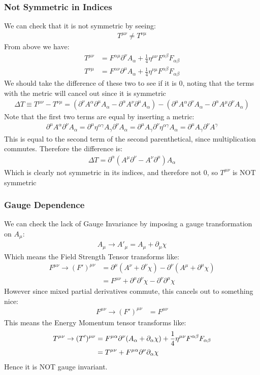 \documentclass[12pt]{article}
\newcommand{\D}{\partial}
\begin{document}
\subsubsection{Not Symmetric in Indices}
We can check that it is not symmetric by seeing:
\begin{align*}
  T^{\mu\nu}\neq T^{\nu\mu}
\end{align*}
From above we have:
\begin{align*}
  T^{\mu\nu}&=F^{\alpha\mu}\D^\nu A_\alpha
  +\frac14\eta^{\mu\nu}F^{\alpha\beta}F_{\alpha\beta}\\
  T^{\nu\mu}&=F^{\alpha\nu}\D^\mu A_\alpha
  +\frac14\eta^{\nu\mu}F^{\alpha\beta}F_{\alpha\beta}
\end{align*}
We should take the difference of these two to see if it is $0$, noting that the terms with the metric will cancel out since it is symmetric
\begin{align*}
  \Delta T\equiv T^{\mu\nu}-T^{\nu\mu}=
  (\D^\nu A^\alpha\D^\mu A_\alpha-\D^\alpha A^\nu\D^\mu A_\alpha)-
  (\D^\mu A^\alpha\D^\nu A_\alpha-\D^\alpha A^\mu\D^\nu A_\alpha)
\end{align*}
Note that the first two terms are equal by inserting a metric:
\begin{align*}
  \D^\mu A^\alpha\D^\nu A_\alpha=\D^\mu\eta^{\alpha\gamma}A_\gamma\D^\nu A_\alpha=
  \D^\mu A_\gamma\D^\nu\eta^{\alpha\gamma}A_\alpha=
  \D^\mu A_\gamma\D^\nu A^\gamma
\end{align*}
This is equal to the second term of the second parenthetical, since multiplication commutes. Therefore the difference is:
\begin{align*}
  \Delta T=\D^\alpha(A^\mu \D^\nu-A^\nu\D^\mu)A_\alpha
\end{align*}
Which is clearly not symmetric in its indices, and therefore not 0, so $T^{\mu\nu}$ is NOT symmetric

\subsubsection{Gauge Dependence}
We can check the lack of Gauge Invariance by imposing a gauge transformation on $A_\mu$:
\begin{align*}
  A_\mu\to A'_\mu=A_\mu+\D_\mu\chi
\end{align*}
Which means the Field Strength Tensor transforms like:
\begin{align*}
  F^{\mu\nu}\to (F')^{\mu\nu}&=
  \D^\mu(A^\nu+\D^\nu\chi)-\D^\nu(A^\mu+\D^\mu\chi)\\
  &=F^{\mu\nu}+\D^\mu\D^\nu\chi-\D^\nu\D^\mu\chi
\end{align*}
However since mixed partial derivatives commute, this cancels out to something nice:
\begin{align*}
  F^{\mu\nu}\to (F')^{\mu\nu}&=F^{\mu\nu}
\end{align*}
This means the Energy Momentum tensor transforms like:
\begin{align*}
  T^{\mu\nu}\to (T')^{\mu\nu}&=F^{\mu\alpha}\D^\nu\qty(A_\alpha+\D_\alpha\chi)
  +\frac14\eta^{\mu\nu}F^{\alpha\beta}F_{\alpha\beta}\\
  &=T^{\mu\nu}+F^{\mu\alpha}\D^\nu\D_\alpha\chi
\end{align*}
Hence it is NOT gauge invariant.
\end{document}
